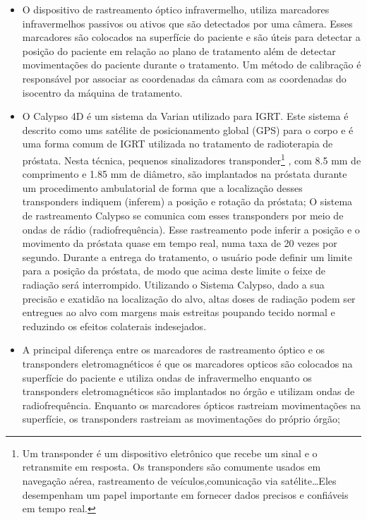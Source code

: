 \documentclass[11pt,a4paper]{article}
\newcounter{exemplo}
\begin{document}
\begin{exemplo}[IGRT]
\begin{itemize}
        \item O dispositivo de rastreamento óptico infravermelho, utiliza marcadores infravermelhos passivos ou ativos que são detectados por uma câmera. Esses marcadores são colocados na superfície do paciente e são úteis para detectar a posição do paciente em relação ao plano de tratamento além de detectar movimentações do paciente durante o tratamento. Um método de calibração é responsável por associar as coordenadas da câmara com as coordenadas do isocentro da máquina de tratamento.
        
        \item O Calypso 4D é um sistema da Varian utilizado para IGRT. Este sistema é descrito como ums satélite de posicionamento global (GPS) para o corpo e é uma forma comum de IGRT utilizada no tratamento de radioterapia de próstata. Nesta técnica,  pequenos sinalizadores transponder\footnote{Um transponder é um dispositivo eletrônico que recebe um sinal e o retransmite em resposta. Os transponders são comumente usados em navegação aérea, rastreamento de veículos,comunicação via satélite\dots Eles desempenham um papel importante em fornecer dados precisos e confiáveis em tempo real.} , com 8.5 mm de comprimento e 1.85 mm de diâmetro, são implantados na próstata durante um procedimento ambulatorial de forma que a localização desses transponders indiquem (inferem) a posição e rotação da próstata; O sistema de rastreamento Calypso se comunica com esses transponders por meio de ondas de rádio (radiofrequência). Esse rastreamento pode inferir a posição e o movimento da próstata quase em tempo real, numa taxa de 20 vezes por segundo. Durante a entrega do tratamento, o usuário pode definir um limite para a posição da próstata, de modo que acima deste limite o feixe de radiação será interrompido. Utilizando o Sistema Calypso, dado a sua precisão e exatidão na localização do alvo, altas doses de radiação podem ser entregues ao alvo com margens mais estreitas poupando tecido normal e reduzindo os efeitos colaterais indesejados.
        
        \item A principal diferença entre os marcadores de rastreamento óptico e os transponders eletromagnéticos é que os marcadores opticos são colocados na superfície do paciente e utiliza ondas de infravermelho enquanto os transponders eletromagnéticos são implantados no órgão e utilizam ondas de radiofrequência. Enquanto os marcadores ópticos rastreiam movimentações na superfície, os transponders rastreiam as movimentações do próprio órgão;
        

\end{itemize}
\end{exemplo}
\end{document}
